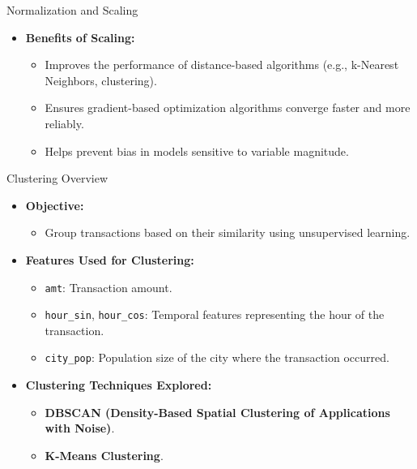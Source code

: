 \documentclass{beamer}
\begin{document}
\begin{frame}{Normalization and Scaling}
    \begin{itemize}
        \item \textbf{Benefits of Scaling:}
        \begin{itemize}
            \item Improves the performance of distance-based algorithms (e.g., k-Nearest Neighbors, clustering).
            \item Ensures gradient-based optimization algorithms converge faster and more reliably.
            \item Helps prevent bias in models sensitive to variable magnitude.
        \end{itemize}
    \end{itemize}
\end{frame}

\begin{frame}{Clustering Overview}
    \begin{itemize}
        \item \textbf{Objective:}
        \begin{itemize}
            \item Group transactions based on their similarity using unsupervised learning.
        \end{itemize}
        \item \textbf{Features Used for Clustering:}
        \begin{itemize}
            \item \texttt{amt}: Transaction amount.
            \item \texttt{hour\_sin}, \texttt{hour\_cos}: Temporal features representing the hour of the transaction.
            \item \texttt{city\_pop}: Population size of the city where the transaction occurred.
        \end{itemize}
        \item \textbf{Clustering Techniques Explored:}
        \begin{itemize}
            \item \textbf{DBSCAN (Density-Based Spatial Clustering of Applications with Noise)}.
            \item \textbf{K-Means Clustering}.
        \end{itemize}
    \end{itemize}
\end{frame}
\end{document}
